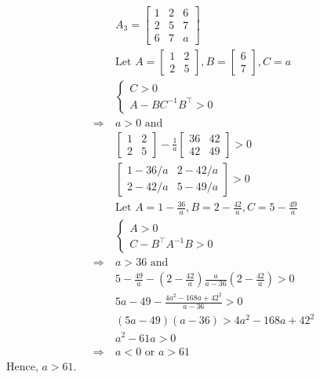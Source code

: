 \documentclass{article}
\theoremstyle{definition} %
\begin{document}
\subsection{}
\begin{align*}
	&A_3=\left[\begin{array}{lll}
	1 & 2 & 6 \\
	2 & 5 & 7 \\
	6 & 7 & a
	\end{array}\right] \\
	&\text {Let } A=\left[\begin{array}{ll}
	1 & 2 \\
	2 & 5
	\end{array}\right], B=\left[\begin{array}{l}
	6 \\
	7
	\end{array}\right], C=a \\
	&\left\{\begin{array}{l}
	C>0 \\
	A-B C^{-1} B^{\top}>0
	\end{array}\right.\\
	\Rightarrow\ &a>0 \text{ and }\\
	&\left[\begin{array}{ll}
	1 & 2 \\
	2 & 5
	\end{array}\right]-\frac{1}{a}\left[\begin{array}{ll}
	36 & 42 \\
	42 & 49
	\end{array}\right]>0\\
	&\left[\begin{array}{cc}
	1-36/a & 2-42/a \\
	2-42/a & 5-49/a
	\end{array}\right]>0\\
	&\text {Let } A=1-\frac{36}{a}, B=2-\frac{42}{a}, C=5-\frac{49}{a} \\
	&\left\{\begin{array}{l}
	A>0 \\
	C-B^{\top} A^{-1} B>0
	\end{array}\right.\\
	\Rightarrow\ &a>36  \text{ and }\\
	&5-\frac{49}{a}-\left(2-\frac{42}{a}\right) \frac{a}{a-36}\left(2-\frac{42}{a}\right)>0 \\
	&5 a-49-\frac{4 a^2-168 a+42^2}{a-36}>0 \\
	&(5 a-49)(a-36)>4 a^2-168 a+42^2 \\
	&a^2-61 a>0 \\
	\Rightarrow\ &a<0  \text { or }  a>61
\end{align*}
Hence, $a>61$.
\end{document}
